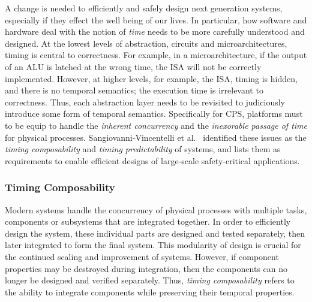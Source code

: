 A change is needed to efficiently and safely design next generation systems, especially if they effect the well being of our lives.
In particular, how software and hardware deal with the notion of \textit{time} needs to be more carefully understood and designed.
At the lowest levels of abstraction, circuits and microarchitectures, timing is central to correctness.
For example, in a microarchitecture, if the output of an ALU is latched at the wrong time, the ISA will not be correctly implemented.
However, at higher levels, for example, the ISA, timing is hidden, and there is no temporal semantics; the execution time is irrelevant to correctness. 
Thus, each abstraction layer needs to be revisited to judiciously introduce some form of temporal semantics. 
Specifically for CPS, platforms must to be equip to handle the \emph{inherent concurrency} and the \emph{inexorable passage of time} for physical processes.   
Sangiovanni-Vincentelli et al.~\cite{Sangiovanni-Vincentelli2007automotive} identified these issues as the \textit{timing composability} and \textit{timing predictability} of systems, and lists them as requirements to enable efficient designs of large-scale safety-critical applications.    

\subsubsection{Timing Composability}
Modern systems handle the concurrency of physical processes with multiple tasks, components or subsystems that are integrated together.    
In order to efficiently design the system, these individual parts are designed and tested separately, then later integrated to form the final system. 
This modularity of design is crucial for the continued scaling and improvement of systems.      
However, if component properties may be destroyed during integration, then the components can no longer be designed and verified separately. 
Thus, \textit{timing composability} refers to the ability to integrate components while preserving their temporal properties.

